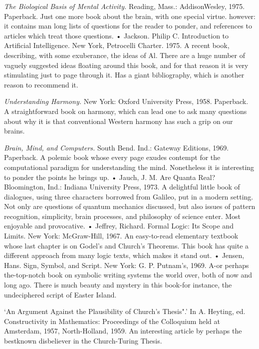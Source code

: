  {\sl The Biological Basis of Mental Activity.} Reading, Mass.: AddisonWesley, 1975. Paperback. Just one more book about the brain, with one special virtue. however: it contains man long lists of questions for the reader to ponder, and references to articles which treat those questions. • Jackson. Philip C. Introduction to Artificial Intelligence. New York, Petrocelli Charter. 1975. A recent book, describing, with some exuberance, the ideas of Al. There are a huge number of vaguely suggested ideas floating around this book, and for that reason it is very stimulating just to page through it. Has a giant bibliography, which is another reason to recommend it.

 {\sl Understanding Harmony.} New York: Oxford University Press, 1958. Paperback. A straightforward book on harmony, which can lead one to ask many questions about why it is that conventional Western harmony has such a grip on our brains.

 {\sl Brain, Mind, and Computers.} South Bend. Ind.: Gateway Editions, 1969. Paperback. A polemic book whose every page exudes contempt for the computational paradigm for understanding the mind. Nonetheless it is interesting to ponder the points he brings up. • Jauch, J. M. Are Quanta Real? Bloomington, Ind.: Indiana University Press, 1973. A delightful little book of dialogues, using three characters borrowed from Galileo, put in a modern setting. Not only are questions of quantum mechanics discussed, but also issues of pattern recognition, simplicity, brain processes, and philosophy of science enter. Most enjoyable and provocative. • Jeffrey, Richard. Formal Logic: Its Scope and Limits. New York: McGraw-Hill, 1967. An easy-to-read elementary textbook whose last chapter is on Godel's and Church's Theorems. This book has quite a different approach from many logic texts, which makes it stand out. • Jensen, Hans. Sign, Symbol, and Script. New York: G. P. Putnam's, 1969. A-or perhaps the-top-notch book on symbolic writing systems the world over, both of now and long ago. There is much beauty and mystery in this book-for instance, the undeciphered script of Easter Island.

 `An Argument Against the Plausibility of Church's Thesis".' In A. Heyting, ed. Constructivity in Mathematics: Proceedings of the Colloquium held at Amsterdam, 1957, North-Holland, 1959. An interesting article by perhaps the bestknown disbeliever in the Church-Turing Thesis.


